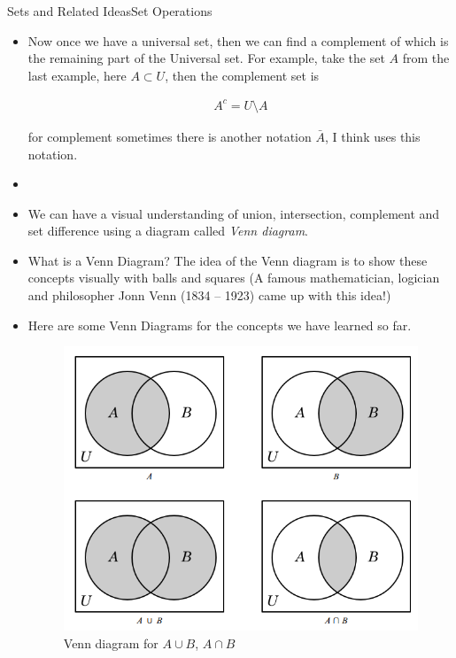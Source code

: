 \documentclass[8pt,usepdftitle=false]{beamer}
\begin{document}
\begin{frame}[allowframebreaks]{Sets and Related Ideas}{Set Operations}
\begin{itemize}
\item Now once we have a universal set, then we can find a complement of which is the remaining part of the Universal set. For example, take the set $A$ from the last example, here $A \subset U$, then the complement set is 

\begin{align}
    A^{c} = U \setminus A
\end{align}

for complement sometimes there is another notation $\bar{A}$, I think \citet*{chiang_2005} uses this notation.



\item {}

\framebreak

\item We can have a visual understanding of union, intersection, complement and set difference using a diagram called \emph{Venn diagram}. 

\item What is a Venn Diagram? The idea of the Venn diagram is to show these concepts visually with balls and squares (A famous mathematician, logician and philosopher Jonn Venn (1834 – 1923) came up with this idea!)

\item Here are some Venn Diagrams for the concepts we have learned so far. 



\begin{figure}[H]
\includegraphics[scale = .3]{Images/Venndiagrams_part1.png}
\caption{Venn diagram for $A\cup B$, $A\cap B$ }
\end{figure}





\end{itemize}
\end{frame}
\end{document}
